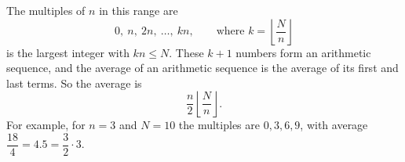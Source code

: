 The multiples of $n$ in this range are
\[0,\ n,\ 2n,\ \dots,\ kn,\qquad\text{where }k=\left\lfloor\dfrac {N}{n}\right\rfloor\]
is the largest integer with $kn\le N$. These $k+1$ numbers form an arithmetic sequence, and the average of an arithmetic sequence is the average of its first and last terms. So the average is
\[\boxed{\dfrac{n}{2}\left\lfloor\dfrac{N}{n}\right\rfloor}.\]
For example, for $n=3$ and $N=10$ the multiples are $0,3,6,9$, with average $\dfrac{18}{4}=4.5=\dfrac{3}{2}\cdot3$.
